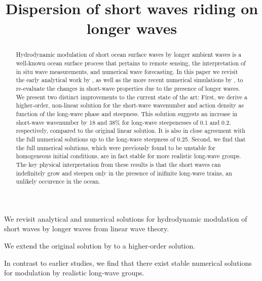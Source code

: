 \documentclass[draft]{agujournal2019}
\begin{document}
\title{Dispersion of short waves riding on longer waves}




\begin{keypoints}
\item We revisit analytical and numerical solutions for hydrodynamic modulation of short waves by longer waves from linear wave theory.
\item We extend the original solution by  to a higher-order solution.
\item In contrast to earlier studies, we find that there exist stable numerical solutions for modulation by realistic long-wave groups.
\end{keypoints}

\begin{abstract}
Hydrodynamic modulation of short ocean surface waves by longer ambient waves is
a well-known ocean surface process that pertains to remote sensing, the
interpretation of in situ wave measurements, and numerical wave forecasting.
In this paper we revisit the early analytical work by ,
as well as the more recent numerical simulations by ,
to re-evaluate the changes in short-wave properties due to the presence of longer waves.
We present two distinct improvements to the current state of the art:
First, we derive a higher-order, non-linear solution for the short-wave wavenumber
and action density as function of the long-wave phase and steepness.
This solution suggests an increase in short-wave wavenumber by 18 and 38\% for
long-wave steepenesses of 0.1 and 0.2, respectively, compared to the original
linear solution.
It is also in close agreement with the full numerical solutions up to the
long-wave steepness of 0.25.
Second, we find that the full numerical solutions, which were previously found
to be unstable for homogeneous initial conditions, are in fact stable for more
realistic long-wave groups.
The key physical interpretation from these results is that the short waves can
indefinitely grow and steepen only in the presence of inifinite long-wave trains,
an unlikely occurence in the ocean.
\end{abstract}
\end{document}
